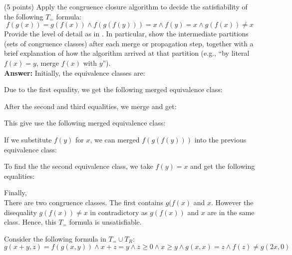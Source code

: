 \documentclass{handout}
\begin{document}
\begin{questions}
\item (5 points) \label{prob:smt:first} Apply the congruence closure algorithm
to decide the satisfiability of the following $T_=$ formula:
\[
f(g(x)) = g(f(x)) \wedge f(g(f(y))) = x \wedge f(y) = x \wedge g(f(x)) \neq x
\]
Provide the level of detail as in .  In particular, show the
intermediate partitions (sets of congruence classes) after each merge or
propagation step, together with a brief explanation of how the algorithm arrived
at that partition (e.g., ``by literal $f(x) = y$, merge $f(x)$ with $y$'').
\label{prob:first}\\

\textbf{Answer:}
Initially, the equivalence classes are:

Due to the first equality, we get the following merged equivalence class:

After the second and third equalities, we merge and get:

This give use the following merged equivalence class:

If we substitute $f(y)$ for $x$, we can merged $f(g(f(y)))$ into the previous equivalence class: 

To find the the second equivalence class, we take $f(y) = x$ and get the following equalities:


Finally, 
\\

There are two congruence classes. The first contains $g(f(x)$ and $x$. However the disequality $g(f(x)) \neq x$ in contradictory as $g(f(x))$ and $x$ are in the same class. Hence, this $T_{=}$ formula is unsatisfiable.







\item Consider the following formula in $T_=\cup T_R$:
\[
g(x + y, z) = f(g(x, y)) \wedge x + z = y \wedge z \geq 0 \wedge x \geq y \wedge g(x, x) = z \wedge f(z) \neq g(2x, 0)
\]


\end{questions}
\end{document}
